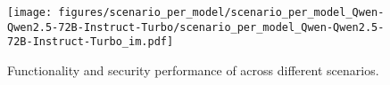 
\begin{figure}[h]
    \centering
    \texttt{[image: figures/scenario\_per\_model/scenario\_per\_model\_Qwen-Qwen2.5-72B-Instruct-Turbo/scenario\_per\_model\_Qwen-Qwen2.5-72B-Instruct-Turbo\_im.pdf]}
    \caption{Functionality and security performance of \qwenst{} across different scenarios.}
    \label{fig:scenario_per_model_Qwen-Qwen2.5-72B-Instruct-Turbo}
\end{figure}
